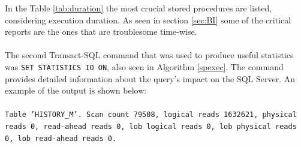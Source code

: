 \documentclass{cslthse-msc}
\begin{document}
\noindent In the Table \ref{tab:duration} the most crucial stored procedures are listed, considering execution duration. As seen in section \ref{sec:BI} some of the critical reports are the ones that are troublesome time-wise.\\\\
The second Transact-SQL command that was used to produce useful statistics was \texttt{SET STATISTICS IO ON}, also seen in Algorithm \ref{spexec}.  The command provides detailed information about the query's impact on the SQL Server. An example of the output is shown below:\\\\
\texttt{Table 'HISTORY\_M'. Scan count 79508, logical reads 1632621, physical reads 0, read-ahead reads 0, lob logical reads 0, lob physical reads 0, lob read-ahead reads 0.}\\\\
\end{document}
